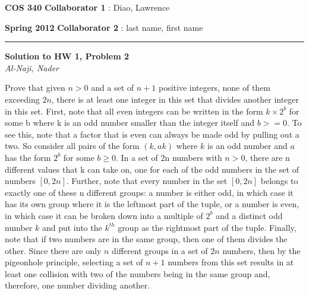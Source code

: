 \documentclass[12pt]{article}
\newcommand{\myheader}[4]
{\vspace*{-0.5in}
\noindent
{#1} \hfill {#3}

\noindent
{#2} \hfill {#4}

\noindent
\rule[8pt]{\textwidth}{1pt}

\vspace{1ex} 
}  %
\newcommand{\myalgsheader}[0]
{\myheader
{ {\bf{COS 340}} }
{ {\bf{Spring 2012}} }
{ {\bf{Collaborator 1}} : Diao, Lawrence }
{ {\bf{Collaborator 2}} : last name, first name}
}
\newcommand{\myhwtitle}[3]
{\begin{center}
{\large {\bf Solution to HW {#1}, Problem {#2}}}\\
\medskip 
{\it {#3}} %
\end{center}}
\begin{document}
\pagebreak
\myalgsheader
\pagestyle{plain}
\myhwtitle{1}{2}{Al-Naji, Nader}
\bigskip
Prove that given $n > 0$ and a set of $n+1$ positive integers, none of them exceeding $2n$, there is at least one integer in this set that divides 
another integer in this set.
\newline
\newline
First, note that all even integers can be written in the form $k \times 2^b$ for some b where k is an odd number smaller than the integer itself and $b >= 0$. To see this, note that a factor that is even can always be made odd by pulling out a two. So consider all pairs of the form $(k, ak)$ where $k$ is an odd number and $a$ has the form $2^b$ for some $b \geq 0$. In a set of 2n numbers with $n > 0$, there are
n different values that k can take on, one for each of the odd numbers in the set of numbers $[0,2n]$. Further, note that every number in the set $[0,2n]$ belongs to exactly one of
these n different groups: a number is either odd, in which case it has its own group where it is the leftmost part of the tuple, or a number is even, in which case it can be broken down
into a multiple of $2^b$ and a distinct odd number $k$ and put into the $k^{th}$ group as the rightmost part of the tuple. Finally, note that if two numbers are in the same
group, then one of them divides the other. Since there are only $n$ different groups in a set of $2n$ numbers, then by the pigeonhole principle, selecting a set of $n+1$ numbers from
this set results in at least one collision with two of the numbers being in the same group and, therefore, one number dividing another. 
\end{document}

